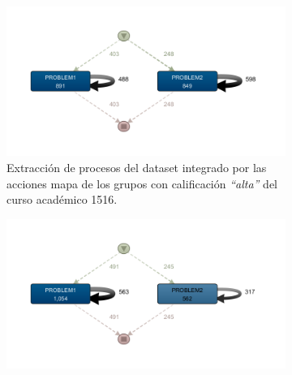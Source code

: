 \begin{figure}[H]
  \begin{subfigure}[t]{0.60\textwidth}
    \includegraphics[width=1.10\textwidth, height=0.80\textwidth]{imagenes/DISCO_map/Dataset FusionadoYear1516HighGrades.png}
    \caption{Extracción de procesos del dataset integrado por las acciones mapa de los grupos con calificación \emph{``alta''} del curso académico 1516.}
    \label{fig:mapYear1516HighGrades}
  \end{subfigure}
  \hfill
  \begin{subfigure}[t]{0.60\textwidth}
    \includegraphics[width=1.10\textwidth, height=0.80\textwidth]{imagenes/DISCO_map/Dataset FusionadoYear1617HighGrades.png}

\end{subfigure}
\end{figure}
